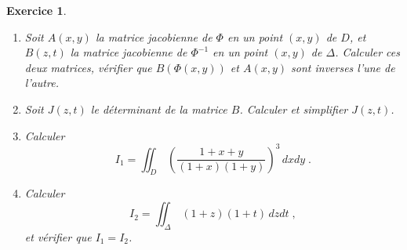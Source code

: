 \documentclass{article}
\newtheorem{exo}{Exercice}[section]
\begin{document}
\begin{giacjshere}
\begin{exo}
{\begin{enumerate}
\item
Soit $A(x,y)$ la matrice jacobienne de $\Phi$ en un point $(x,y)$ de
$D$, et $B(z,t)$ la matrice jacobienne de $\Phi^{-1}$ en un point $(x,y)$ de
$\Delta$. Calculer ces deux matrices, v\'erifier que $B(\Phi(x,y))$ et
$A(x,y)$ sont inverses l'une de l'autre.
\item
Soit $J(z,t)$ le d\'eterminant de la matrice $B$. Calculer et
simplifier $J(z,t)$.
\item
Calculer
$$
I_1=\iint_D\,\left( \frac{1+x+y}{(1+x)(1+y)} \right)^3 \,dxdy\;.
$$  
\item
Calculer
$$
I_2=\iint_\Delta\,(1+z)(1+t)\,dzdt\;,
$$  
et v\'erifier que $I_1=I_2$.
\end{enumerate}
}\end{exo}


\end{giacjshere}
\end{document}

